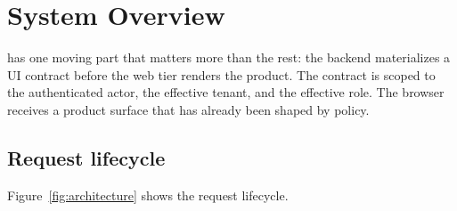 \section{System Overview}
\label{sec:system_overview}

\uiPolicy{} has one moving part that matters more than the rest: the backend materializes a UI contract before the web tier renders the product. The contract is scoped to the authenticated actor, the effective tenant, and the effective role. The browser receives a product surface that has already been shaped by policy.

\subsection{Request lifecycle}
\label{sec:lifecycle}

Figure~\ref{fig:architecture} shows the request lifecycle.

